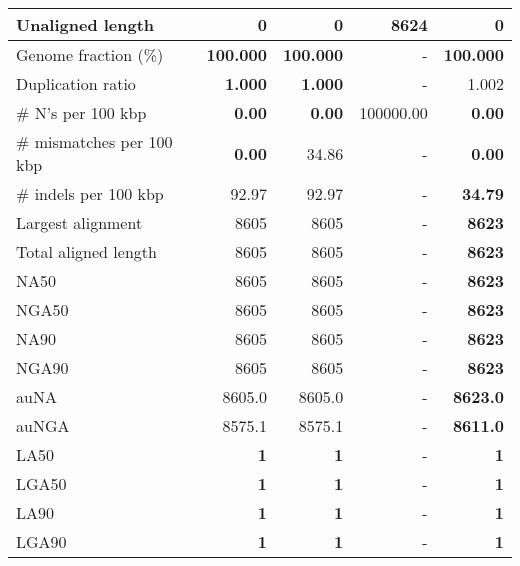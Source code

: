 \documentclass[12pt,a4paper]{article}
\begin{document}
\begin{table}[ht]
\begin{center}
\begin{tabular}{|l*{4}{|r}|}
Unaligned length & {\bf 0} & {\bf 0} & 8624 & {\bf 0} \\ \hline
Genome fraction (\%) & {\bf 100.000} & {\bf 100.000} & - & {\bf 100.000} \\ \hline
Duplication ratio & {\bf 1.000} & {\bf 1.000} & - & 1.002 \\ \hline
\# N's per 100 kbp & {\bf 0.00} & {\bf 0.00} & 100000.00 & {\bf 0.00} \\ \hline
\# mismatches per 100 kbp & {\bf 0.00} & 34.86 & - & {\bf 0.00} \\ \hline
\# indels per 100 kbp & 92.97 & 92.97 & - & {\bf 34.79} \\ \hline
Largest alignment & 8605 & 8605 & - & {\bf 8623} \\ \hline
Total aligned length & 8605 & 8605 & - & {\bf 8623} \\ \hline
NA50 & 8605 & 8605 & - & {\bf 8623} \\ \hline
NGA50 & 8605 & 8605 & - & {\bf 8623} \\ \hline
NA90 & 8605 & 8605 & - & {\bf 8623} \\ \hline
NGA90 & 8605 & 8605 & - & {\bf 8623} \\ \hline
auNA & 8605.0 & 8605.0 & - & {\bf 8623.0} \\ \hline
auNGA & 8575.1 & 8575.1 & - & {\bf 8611.0} \\ \hline
LA50 & {\bf 1} & {\bf 1} & - & {\bf 1} \\ \hline
LGA50 & {\bf 1} & {\bf 1} & - & {\bf 1} \\ \hline
LA90 & {\bf 1} & {\bf 1} & - & {\bf 1} \\ \hline
LGA90 & {\bf 1} & {\bf 1} & - & {\bf 1} \\ \hline
\end{tabular}
\end{center}
\end{table}
\end{document}
